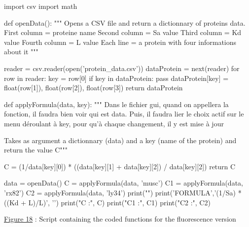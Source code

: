 \documentclass[a4paper,12pt]{report}
\begin{document}
\begin{customFrame}
import csv
import math

def openData():
    """ Opens a CSV file and return a dictionnary of proteins data. 
    First column = proteine name
    Second column = Sa value
    Third column = Kd value
    Fourth column = L value
    Each line = a protein with four informations about it """

    reader = csv.reader(open('protein_data.csv'))
    dataProtein = {}
    next(reader)
    for row in reader:
        key = row[0]
        if key in dataProtein:
            pass
        dataProtein[key] = float(row[1]), float(row[2]), float(row[3])
    return dataProtein



def applyFormula(data, key):
    """ Dans le fichier gui, quand on appellera la fonction, 
        il faudra bien voir qui est data. Puis, il faudra lier le choix
        actif sur le menu déroulant à key, pour qu'à chaque changement,
        il y est mise à jour 
        
        Takes as argument a dictionnary (data) and a key (name of the protein) and return the value C"""

    C = (1/data[key][0]) * ((data[key][1] + data[key][2]) / data[key][2])
    return C


data = openData()
C = applyFormula(data, 'musc')
C1 = applyFormula(data, 'rx82')
C2 = applyFormula(data, 'ly34')
print("")
print('FORMULA','\n(1/Sa) * ((Kd + L)/L)', '\n')
print("C :", C)
print("C1 :", C1)
print("C2 :", C2)\end{customFrame}
\begin{center} \underline{Figure 18} : Script containing the coded functions for the fluorescence version \end{center} \vspace{1\baselineskip} 


\end{document}
